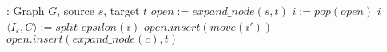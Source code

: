 \begin{algorithmic}
: Graph $G$, source $s$, target $t$
\STATE $open := expand\_node(s,t)$
\LOOP
  \STATE $i := pop(open)$
     $i$
  \ENDIF
  \STATE $\langle I_\varepsilon, C\rangle := split\_epsilon(i)$
    \STATE $open.insert(move(i'))$
  \ENDFOR
    \STATE $open.insert(expand\_node(c),t)$
  \ENDFOR
\ENDLOOP
\end{algorithmic}

